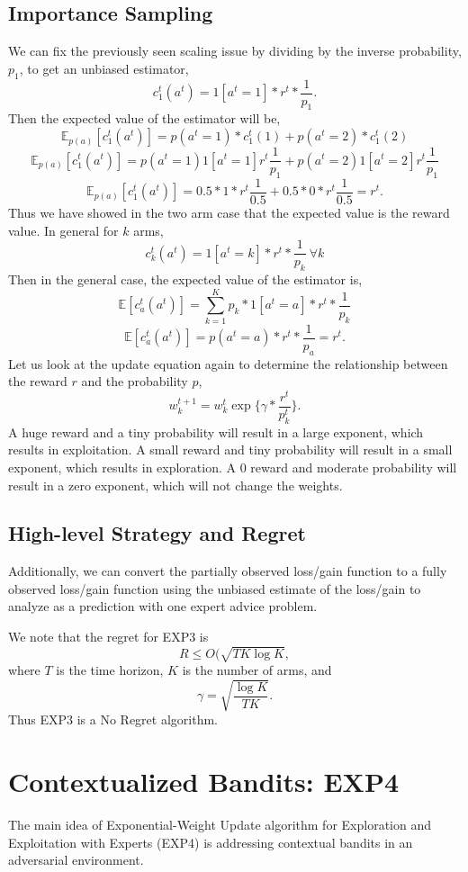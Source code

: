 \documentclass[11pt]{article}
\begin{document}
\subsection{Importance Sampling}
We can fix the previously seen scaling issue by dividing by the inverse probability, $p_1$, to get an unbiased estimator,
$$ c_1^t (a^t) = 1[a^t = 1] *r^t * \frac{1}{p_1}. $$
Then the expected value of the estimator will be,
$$ \mathbb{E}_{p(a)}[c_1^t(a^t)] = p(a^t = 1) * c^t_1(1) + p(a^t = 2) * c_1^t (2)$$
$$ \mathbb{E}_{p(a)}[c_1^t(a^t)] = p(a^t = 1) 1[a^t = 1]r^t\frac{1}{p_1} + p(a^t = 2) 1[a^t=2] r^t \frac{1}{p_1}$$
$$ \mathbb{E}_{p(a)}[c_1^t(a^t)] = 0.5*1*r^t\frac{1}{0.5}+0.5*0*r^t \frac{1}{0.5} = r^t.$$
Thus we have showed in the two arm case that the expected value is the reward value. In general for $k$ arms,
$$ c_k^t (a^t) = 1[a^t = k] * r^t * \frac{1}{p_k} \  \forall k $$
Then in the general case, the expected value of the estimator is,
$$ \mathbb{E} [c_a^t (a^t) ] = \sum_{k=1}^K p_k * 1[a^t = a] * r^t * \frac{1}{p_k} $$
$$ \mathbb{E} [c_a^t (a^t) ] = p(a^t = a) * r^t * \frac{1}{p_a} = r^t.$$
Let us look at the update equation again to determine the relationship between the reward $r$ and the probability $p$,
$$ w_k^{t+1} = w_k^t \exp\{\gamma * \frac{r^t}{p_k^t}\}.$$
A huge reward and a tiny probability will result in a large exponent, which results in exploitation. A small reward and tiny probability will result in a small exponent, which results in exploration. A 0 reward and moderate probability will result in a zero exponent, which will not change the weights.

\subsection{High-level Strategy and Regret}
Additionally, we can convert the partially observed loss/gain function to a fully observed loss/gain function using the unbiased estimate of the loss/gain to analyze as a prediction with one expert advice problem.

We note that the regret for EXP3 is 
$$ R \leq O(\sqrt{TK\log K}, $$
where $T$ is the time horizon, $K$ is the number of arms, and $$ \gamma = \sqrt{\frac{\log K}{TK}}. $$
Thus EXP3 is a No Regret algorithm.

\section{Contextualized Bandits: EXP4}
The main idea of Exponential-Weight Update algorithm for Exploration and Exploitation with Experts (EXP4) is addressing contextual bandits in an adversarial environment.
\end{document}
